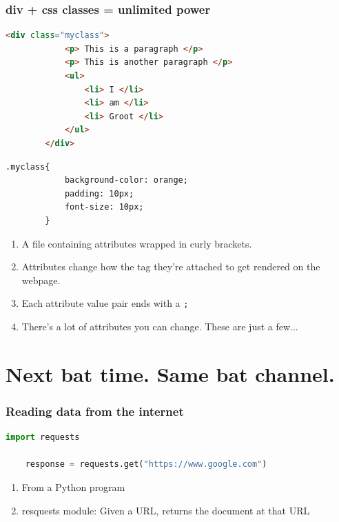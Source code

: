 \documentclass{beamer}
\begin{document}
%
%
\begin{frame}[fragile]
    \frametitle{div + css classes = unlimited power}
    \begin{minipage}{0.48\textwidth}
    \begin{lstlisting}[language=html, basicstyle=\tiny, autogobble]
        <div class="myclass">
            <p> This is a paragraph </p>
            <p> This is another paragraph </p>
            <ul>
                <li> I </li>
                <li> am </li>
                <li> Groot </li>
            </ul>
        </div>
    \end{lstlisting}
    \end{minipage}
    \hfill
    \begin{minipage}{0.44\textwidth}
    \begin{lstlisting}[language=html, basicstyle=\tiny, autogobble]
        .myclass{
            background-color: orange;
            padding: 10px;
            font-size: 10px;
        }
    \end{lstlisting} 
    \end{minipage}
    \vfill
    \begin{enumerate}[A]
        \item A file containing attributes wrapped in curly brackets.
        \item Attributes change how the tag they're attached to get rendered on the webpage.
        \item Each attribute value pair ends with a \lstinline|;|
        \item There's a lot of attributes you can change. These are just a few...
    \end{enumerate}
\end{frame}


\section{Next bat time. Same bat channel.}
\begin{frame}[fragile]
    \frametitle{Reading data from the internet}
    \begin{lstlisting}[language=Python, autogobble]
    import requests

    response = requests.get("https://www.google.com")
    \end{lstlisting} 
    \vfill
    \begin{enumerate}[A]
        \item From a Python program
        \item resquests module: Given a URL, returns the document at that URL
    \end{enumerate}
\end{frame}
\end{document}
